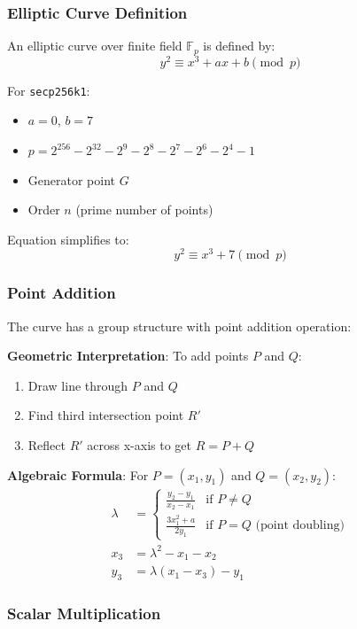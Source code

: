 \documentclass[11pt,a4paper]{article}
\begin{document}
\subsubsection{Elliptic Curve Definition}

An elliptic curve over finite field $\mathbb{F}_p$ is defined by:
\[
y^2 \equiv x^3 + ax + b \pmod{p}
\]

For \texttt{secp256k1}:
\begin{itemize}
  \item $a = 0$, $b = 7$
  \item $p = 2^{256} - 2^{32} - 2^9 - 2^8 - 2^7 - 2^6 - 2^4 - 1$
  \item Generator point $G$
  \item Order $n$ (prime number of points)
\end{itemize}

Equation simplifies to:
\[
y^2 \equiv x^3 + 7 \pmod{p}
\]

\subsubsection{Point Addition}

The curve has a group structure with point addition operation:

\textbf{Geometric Interpretation}: To add points $P$ and $Q$:
\begin{enumerate}
  \item Draw line through $P$ and $Q$
  \item Find third intersection point $R'$
  \item Reflect $R'$ across x-axis to get $R = P + Q$
\end{enumerate}

\textbf{Algebraic Formula}: For $P = (x_1, y_1)$ and $Q = (x_2, y_2)$:
\begin{align*}
\lambda &= \begin{cases}
\frac{y_2 - y_1}{x_2 - x_1} & \text{if } P \neq Q \\
\frac{3x_1^2 + a}{2y_1} & \text{if } P = Q \text{ (point doubling)}
\end{cases} \\
x_3 &= \lambda^2 - x_1 - x_2 \\
y_3 &= \lambda(x_1 - x_3) - y_1
\end{align*}

\subsubsection{Scalar Multiplication}
\end{document}
